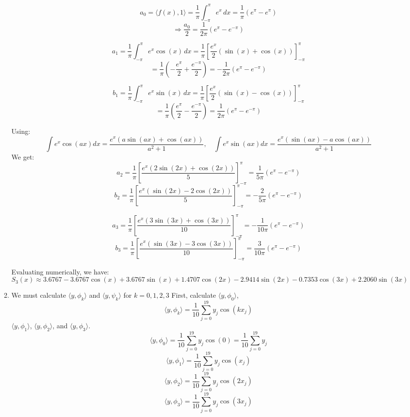 \documentclass[12pt]{article}
\begin{document}
\begin{enumerate}[leftmargin=0em]
\begin{enumerate}[leftmargin=!]
        \[a_0 = \langle f(x), 1 \rangle = \frac{1}{\pi} \int_{-\pi}^{\pi} e^x \, dx = \frac{1}{\pi} (e^{\pi} - e^{\pi})\]
        \[\Rightarrow \frac{a_0}{2} = \frac{1}{2\pi}(e^{\pi} - e^{-\pi})\]

        \[a_1 = \frac{1}{\pi} \int_{-\pi}^{\pi} e^x \cos(x) \, dx = \frac{1}{\pi} \left[ \frac{e^x}{2} (\sin(x) +\cos(x)) \right]_{-\pi}^{\pi}\]
        \[= \frac{1}{\pi} \left( -\frac{e^{\pi}}{2} + \frac{e^{-\pi}}{2} \right) = -\frac{1}{2\pi}(e^{\pi} - e^{-\pi})\]

        \[b_1 = \frac{1}{\pi} \int_{-\pi}^{\pi} e^x \sin(x) \, dx = \frac{1}{\pi} \left[ \frac{e^x}{2} (\sin(x) - \cos(x)) \right]_{-\pi}^{\pi}\]
        \[= \frac{1}{\pi} \left( \frac{e^{\pi}}{2} - \frac{e^{-\pi}}{2} \right) = \frac{1}{2\pi}(e^{\pi} - e^{-\pi})\]

        Using:
        \[\int e^x \cos(ax) dx = \frac{e^x (a \sin(ax) + \cos(ax))}{a^2 + 1}, \quad\int e^x \sin(ax) dx = \frac{e^x (\sin(ax) - a \cos(ax))}{a^2 + 1}\]
        We get:
        \[a_2 = \frac{1}{\pi} \left[ \frac{e^x (2 \sin(2x) + \cos(2x))}{5} \right]_{-\pi}^{\pi}= \frac{1}{5\pi}(e^{\pi} - e^{-\pi})\]
        \[b_2 = \frac{1}{\pi} \left[ \frac{e^x (\sin(2x) - 2 \cos(2x))}{5} \right]_{-\pi}^{\pi}= -\frac{2}{5\pi}(e^{\pi} - e^{-\pi})\]

        \[a_3 = \frac{1}{\pi} \left[ \frac{e^x (3 \sin(3x) + \cos(3x))}{10} \right]_{-\pi}^{\pi}= -\frac{1}{10\pi}(e^{\pi} - e^{-\pi})\]
        \[b_3 = \frac{1}{\pi} \left[ \frac{e^x (\sin(3x) - 3 \cos(3x))}{10} \right]_{-\pi}^{\pi}= \frac{3}{10\pi}(e^{\pi} - e^{-\pi})\]

        Evaluating numerically, we have:
        \[S_3(x) \approx 3.6767 - 3.6767\cos(x) + 3.6767\sin(x) + 1.4707\cos(2x) - 2.9414\sin(2x) - 0.7353\cos(3x) + 2.2060\sin(3x)\]

        \item
        We must calculate \(\langle y,\phi _{k}\rangle \) and \(\langle y,\psi _{k}\rangle \) for \(k=0,1,2,3\) 
        First, calculate \(\langle y,\phi _{0}\rangle \),
        \[\langle y,\phi _{k}\rangle =\frac{1}{10}\sum _{j=0}^{19}y_{j}\cos (kx_{j})\]
        \(\langle y,\phi _{1}\rangle \), \(\langle y,\phi _{2}\rangle \), and \(\langle y,\phi _{3}\rangle \).
        \[\langle y,\phi _{0}\rangle =\frac{1}{10}\sum _{j=0}^{19}y_{j}\cos (0)=\frac{1}{10}\sum _{j=0}^{19}y_{j}\]
        \[\langle y,\phi _{1}\rangle =\frac{1}{10}\sum _{j=0}^{19}y_{j}\cos (x_{j})\]
        \[\langle y,\phi _{2}\rangle =\frac{1}{10}\sum _{j=0}^{19}y_{j}\cos (2x_{j})\]
        \[\langle y,\phi _{3}\rangle =\frac{1}{10}\sum _{j=0}^{19}y_{j}\cos (3x_{j})\]


\end{enumerate}
\end{enumerate}
\end{document}
